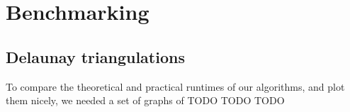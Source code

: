 \section{Benchmarking}


\subsection{Delaunay triangulations}
\label{subsection:delaunay}
To compare the theoretical and practical runtimes of our algorithms, and plot them nicely, we needed a set of graphs of TODO TODO TODO

